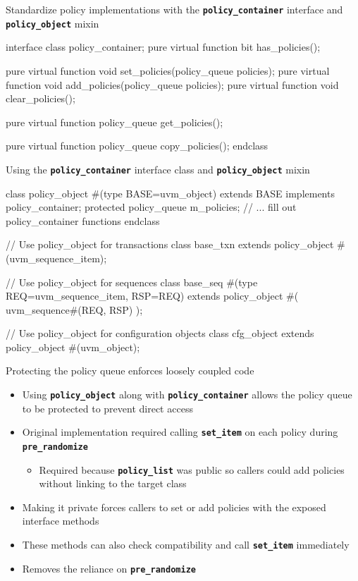 \documentclass[aspectratio=169]{beamer}
\newcommand{\code}[1]{
  \textbf{\texttt{#1}}
}
\begin{document}
\begin{frame}[fragile]{\Large{Standardize policy implementations with the \code{policy_container} interface and \code{policy_object} mixin}}
\begin{svcode}
interface class policy_container;
  pure virtual function bit has_policies();

  pure virtual function void set_policies(policy_queue policies);
  pure virtual function void add_policies(policy_queue policies);
  pure virtual function void clear_policies();

  pure virtual function policy_queue get_policies();

  pure virtual function policy_queue copy_policies();
endclass
\end{svcode}
\end{frame}

\begin{frame}[fragile]{Using the \code{policy_container} interface class and \code{policy_object} mixin}
\scriptsize
\begin{svcode}
class policy_object #(type BASE=uvm_object) extends BASE implements policy_container;
  protected policy_queue m_policies;
  // ... fill out policy_container functions
endclass
\end{svcode}
\begin{svcode}
// Use policy_object for transactions
class base_txn extends policy_object #(uvm_sequence_item);

// Use policy_object for sequences
class base_seq #(type REQ=uvm_sequence_item, RSP=REQ) extends policy_object #( uvm_sequence#(REQ, RSP) );

// Use policy_object for configuration objects
class cfg_object extends policy_object #(uvm_object);
\end{svcode}
\end{frame}

\begin{frame}[fragile]{Protecting the policy queue enforces loosely coupled code}
\begin{itemize}
  \item Using \code{policy_object} along with \code{policy_container} allows the policy queue to be protected to prevent direct access
  \item Original implementation required calling \code{set_item} on each policy during \code{pre_randomize}
  \begin{itemize}
    \item Required because \code{policy_list} was public so callers could add policies without linking to the target class
  \end{itemize}
  \item Making it private forces callers to set or add policies with the exposed interface methods
  \item These methods can also check compatibility and call \code{set_item} immediately
  \item Removes the reliance on \code{pre_randomize}
\end{itemize}
\end{frame}
\end{document}
